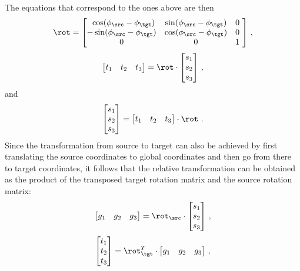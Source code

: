 \documentclass[paper=a4,fontsize=11pt]{scrartcl}
\numberwithin{equation}{section}		%
\numberwithin{figure}{section}			%
\numberwithin{table}{section}				%
\begin{document}
The equations that correspond to the ones above are then
\begin{equation}
\rot = 
\begin{bmatrix}
\ \,\cos(\phi_\src-\phi_\tgt) & \sin(\phi_\src-\phi_\tgt) & 0\ \\
   -\sin(\phi_\src-\phi_\tgt) & \cos(\phi_\src-\phi_\tgt) & 0\ \\
             0 &          0 & 1\ 
\end{bmatrix} \,,
\end{equation}
\begin{equation}
    \begin{bmatrix}
    t_1 & t_2 & t_3 
    \end{bmatrix}
    = \rot \cdot
    \begin{bmatrix}
    s_1 \\
    s_2 \\
    s_3
    \end{bmatrix} \,,
\end{equation}
and
\begin{equation}
    \begin{bmatrix}
    s_1 \\
    s_2 \\
    s_3
    \end{bmatrix}
    = 
    \begin{bmatrix}
    t_1 & t_2 & t_3 
    \end{bmatrix} 
    \cdot \rot \ .
\end{equation}
Since the transformation from source to target can also be achieved by first translating the source coordinates to global coordinates and then go from there to target coordinates, it follows that the relative transformation can be obtained as the product of the transposed target rotation matrix and the source rotation matrix:
\begin{equation}
    \begin{bmatrix}
    g_1 & g_2 & g_3 
    \end{bmatrix}
    = \rot_\src \cdot
    \begin{bmatrix}
    s_1 \\
    s_2 \\
    s_3
    \end{bmatrix} \,,
\end{equation}
\begin{equation}
    \begin{bmatrix}
    t_1 \\
    t_2 \\
    t_3
    \end{bmatrix}
    = \rot_\tgt^T
    \cdot
    \begin{bmatrix}
    g_1 & g_2 & g_3 
    \end{bmatrix} \,,
\end{equation}
\end{document}
